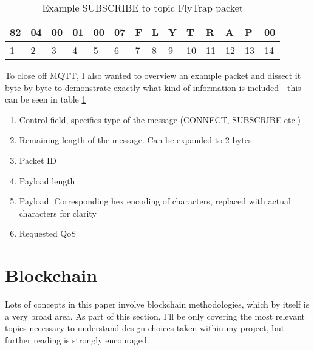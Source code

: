 \begin{table}[]
\centering
\begin{tabular}{llllllllllllll}
\hline
\multicolumn{1}{|l|}{82} & \multicolumn{1}{l|}{04} & \multicolumn{1}{l|}{00} & \multicolumn{1}{l|}{01} & \multicolumn{1}{l|}{00} & \multicolumn{1}{l|}{07} & \multicolumn{1}{l|}{F} & \multicolumn{1}{l|}{L} & \multicolumn{1}{l|}{Y} & \multicolumn{1}{l|}{T} & \multicolumn{1}{l|}{R} & \multicolumn{1}{l|}{A} & \multicolumn{1}{l|}{P} & \multicolumn{1}{l|}{00} \\ \hline
1                        & 2                       & 3                       & 4                       & 5                       & 6                       & 7                      & 8                      & 9                      & 10                     & 11                     & 12                     & 13                     & 14                     
\end{tabular}
\caption{Example SUBSCRIBE to topic FlyTrap packet}
\label{tab:sub_packet}
\end{table}

To close off MQTT, I also wanted to overview an example packet and dissect it byte by byte to demonstrate exactly what kind of information is included - this can be seen in table \ref{tab:sub_packet}
\begin{enumerate}
  \item [1] Control field, specifies type of the message (CONNECT, SUBSCRIBE etc.)
  \item [2] Remaining length of the message. Can be expanded to 2 bytes.
  \item [3-4] Packet ID
  \item [5-6] Payload length
  \item [7-13] Payload. Corresponding hex encoding of characters, replaced with actual characters for clarity
  \item [14] Requested QoS
\end{enumerate}

\section{Blockchain}

Lots of concepts in this paper involve blockchain methodologies, which by itself is a very broad area. As part of this section, I'll be only covering the most relevant topics necessary to understand design choices taken within my project, but further reading is strongly encouraged.

